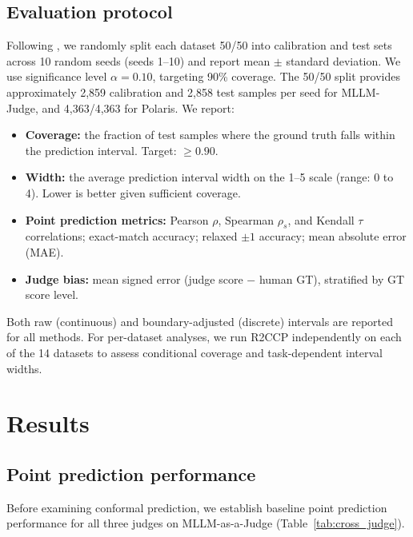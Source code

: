 \documentclass{article}
\begin{document}
\subsection{Evaluation protocol}
\label{sec:protocol}

Following \citet{sheng2025analyzing}, we randomly split each dataset 50/50 into calibration and test sets across 10 random seeds (seeds 1--10) and report mean $\pm$ standard deviation. We use significance level $\alpha = 0.10$, targeting 90\% coverage. The 50/50 split provides approximately 2,859 calibration and 2,858 test samples per seed for MLLM-Judge, and 4,363/4,363 for Polaris. We report:

\begin{itemize}[leftmargin=*,itemsep=1pt,topsep=2pt]
\item \textbf{Coverage:} the fraction of test samples where the ground truth falls within the prediction interval. Target: $\geq 0.90$.
\item \textbf{Width:} the average prediction interval width on the 1--5 scale (range: 0 to 4). Lower is better given sufficient coverage.
\item \textbf{Point prediction metrics:} Pearson $\rho$, Spearman $\rho_s$, and Kendall $\tau$ correlations; exact-match accuracy; relaxed $\pm 1$ accuracy; mean absolute error (MAE).
\item \textbf{Judge bias:} mean signed error (judge score $-$ human GT), stratified by GT score level.
\end{itemize}

Both raw (continuous) and boundary-adjusted (discrete) intervals are reported for all methods. For per-dataset analyses, we run R2CCP independently on each of the 14 datasets to assess conditional coverage and task-dependent interval widths.

\section{Results}
\label{sec:results}

\subsection{Point prediction performance}
\label{sec:point_prediction}

Before examining conformal prediction, we establish baseline point prediction performance for all three judges on MLLM-as-a-Judge (Table~\ref{tab:cross_judge}).
\end{document}
